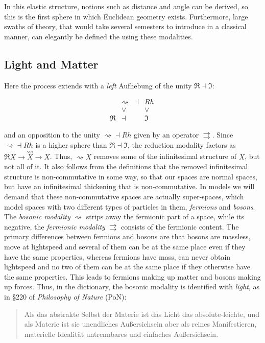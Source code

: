 \documentclass{article}
\begin{document}
In this elastic structure, notions such as distance and angle can be derived, so this is the first sphere in which Euclidean geometry exists. Furthermore, large swaths of theory, that would take several semesters to introduce in a classical manner, can elegantly be defined the using these modalities.



\subsection{Light and Matter}
Here the process extends with a \emph{left} Aufhebung of the unity $\Re\dashv\Im$: 


$$
  \begin{array}{cccc}
     & \rightsquigarrow & \dashv & Rh
    \\
     & \vee & & \vee
    \\
    \Re & \dashv & & \Im
    \end{array}
  \ 
$$

and an opposition to the unity $\rightsquigarrow\dashv Rh$ given by an operator $\rightrightarrows$. Since $\rightsquigarrow\dashv Rh$ is a higher sphere than $\Re\dashv\Im$, the reduction modality factors as $\Re X\rightarrow\overset{\rightsquigarrow }{X}\rightarrow X$. Thus, $\rightsquigarrow X$ removes some of the infinitesimal structure of $X$, but not all of it. It also follows from the definitions that the removed infinitesimal structure is non-commutative in some way, so that our spaces are normal spaces, but have an infinitesimal thickening that is non-commutative. In models we will demand that these non-commutative spaces are actually super-spaces, which model spaces with two different types of particles in them, \emph{fermions} and \emph{bosons}. The \emph{bosonic modality} $\rightsquigarrow$ strips away the fermionic part of a space, while its negative, the \emph{fermionic modality} $\rightrightarrows$ consists of the fermionic content. The primary differences between fermions and bosons are that bosons are massless, move at lightspeed and several of them can be at the same place even if they have the same properties, whereas fermions have mass, can never obtain lightspeed and no two of them can be at the same place if they otherwise have the same properties. This leads to fermions making up matter and bosons making up forces. Thus, in the dictionary, the bosonic modality is identified with \emph{light}, as in §220 of \emph{Philosophy of Nature} (PoN)\cite{EoS}:

\begin{quote}
    Als das abstrakte Selbst der Materie ist das Licht das absolute-leichte, und als Materie ist sie unendliches Außersichsein aber als reines Manifestieren, materielle Idealität untrennbares und einfaches Außersichsein.
\end{quote}
\end{document}
